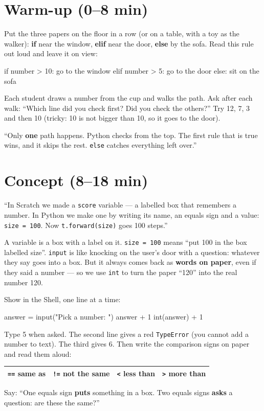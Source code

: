 \section{Warm-up (0--8 min)}
\begin{unplugged}
Put the three papers on the floor in a row (or on a table, with a toy as the walker): \textbf{if} near the window, \textbf{elif} near the door, \textbf{else} by the sofa. Read this rule out loud and leave it on view:
\begin{pycode}
if number > 10:
    go to the window
elif number > 5:
    go to the door
else:
    sit on the sofa
\end{pycode}
Each student draws a number from the cup and walks the path. Ask after each walk: \enquote{Which line did you check first? Did you check the others?} Try 12, 7, 3 and then 10 (tricky: 10 is not bigger than 10, so it goes to the door).
\end{unplugged}
\begin{teacherscript}
\enquote{Only \textbf{one} path happens. Python checks from the top. The first rule that is true wins, and it skips the rest. \texttt{else} catches everything left over.}
\end{teacherscript}

\section{Concept (8--18 min)}
\begin{teacherscript}
\enquote{In Scratch we made a \texttt{score} variable --- a labelled box that remembers a number. In Python we make one by writing its name, an equals sign and a value: \texttt{size = 100}. Now \texttt{t.forward(size)} goes 100 steps.}
\end{teacherscript}
\begin{analogy}
A variable is a box with a label on it. \texttt{size = 100} means \enquote{put 100 in the box labelled size}. \texttt{input} is like knocking on the user's door with a question: whatever they say goes into a box. But it always comes back as \textbf{words on paper}, even if they said a number --- so we use \texttt{int} to turn the paper \enquote{120} into the real number 120.
\end{analogy}
Show in the Shell, one line at a time:
\begin{pycode}
answer = input("Pick a number: ")
answer + 1
int(answer) + 1
\end{pycode}
Type 5 when asked. The second line gives a red \texttt{TypeError} (you cannot add a number to text). The third gives 6. Then write the comparison signs on paper and read them aloud:
\begin{center}
\begin{tabular}{@{}llll@{}}
\toprule
\texttt{==} same as & \texttt{!=} not the same & \texttt{<} less than & \texttt{>} more than \\
\bottomrule
\end{tabular}
\end{center}
Say: \enquote{One equals sign \textbf{puts} something in a box. Two equals signs \textbf{asks} a question: are these the same?}

